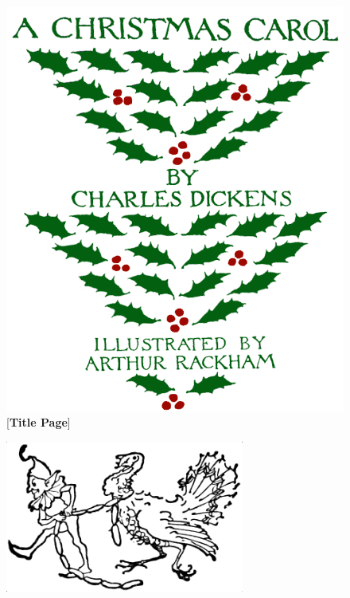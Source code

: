 \documentclass[
a5paper,
BCOR=7mm,
twoside,
DIV=calc,
fontsize=12pt,
usegeometry,
dottedtocline,
headers=normal,
listof=numbered,
listof=totoc,
listof=flat,
listof=nochaptergap]{scrbook} %
\begin{document}
\frontmatter
\renewcommand*{\sectionmarkformat}{}

\renewcommand*\raggedchapter{\centering}
\pagestyle{empty}
\begin{figure}[p]
\begin{minipage}[c]{\linewidth}
\includegraphics[width=\linewidth]{newaccfront}
[\textbf{Title Page}]{}
\end{minipage}
\end{figure}
\thispagestyle{empty}


\pagestyle{plain}

\tableofcontents
\vfill
\begin{figure}[h!]
\centering
\includegraphics[width=0.7\textwidth]{elfturkey}
\caption[Tailpiece to Table of Contents]{}
\end{figure}
\clearpage
\end{document}
